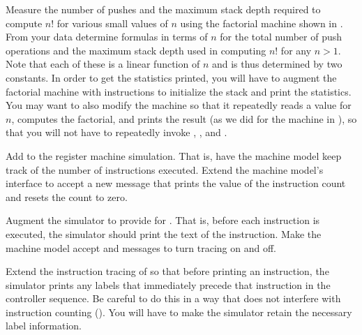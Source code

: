 \begin{exercise}
	\label{Exercise 5.14}
	Measure the number of pushes and the maximum stack depth required to compute \( n!
	\) for various small values of \( n \) using the factorial machine shown in .
	From your data determine formulas in terms of \( n \) for the total number of push operations and the maximum stack depth used in computing \( n!
	\) for any \( n > 1 \).
	Note that each of these is a linear function of \( n \) and is thus determined by two constants.
	In order to get the statistics printed, you will have to augment the factorial machine with instructions to initialize the stack and print the statistics.
	You may want to also modify the machine so that it repeatedly reads a value for \( n \), computes the factorial, and prints the result (as we did for the  machine in ), so that you will not have to repeatedly invoke , , and .
\end{exercise}



\begin{exercise}
	\label{Exercise 5.15}
	Add  to the register machine simulation.
	That is, have the machine model keep track of the number of instructions executed.
	Extend the machine model’s interface to accept a new message that prints the value of the instruction count and resets the count to zero.
\end{exercise}



\begin{exercise}
	\label{Exercise 5.16}
	Augment the simulator to provide for .
	That is, before each instruction is executed, the simulator should print the text of the instruction.
	Make the machine model accept  and  messages to turn tracing on and off.
\end{exercise}



\begin{exercise}
	\label{Exercise 5.17}
	Extend the instruction tracing of  so that before printing an instruction, the simulator prints any labels that immediately precede that instruction in the controller sequence.
	Be careful to do this in a way that does not interfere with instruction counting ().
	You will have to make the simulator retain the necessary label information.
\end{exercise}



